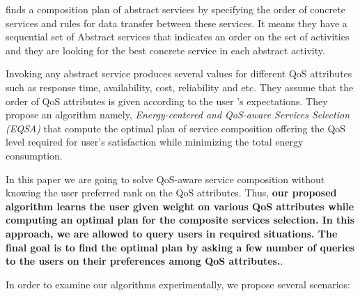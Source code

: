 \documentclass{sigchi}
\begin{document}
\cite{DBLP:journals/tase/KhanoucheACKY16} finds a composition plan of abstract services by specifying the order of concrete services and rules for data transfer between these services. It means they have a sequential set of Abstract services that indicates an order on the set of activities and they are looking for the best concrete service in each abstract activity. 

Invoking any abstract service produces several values for different QoS attributes such as response time, availability, cost, reliability and etc. They assume that the order of QoS attributes is given according to the user 's expectations. They propose an algorithm namely, \emph{Energy-centered and QoS-aware Services Selection (EQSA)} that compute the optimal plan of service composition offering the QoS level required for user's satisfaction while minimizing the total energy consumption.

In this paper we are going to solve QoS-aware service composition without knowing the user preferred rank on the QoS attributes. Thus, \textbf{our proposed algorithm learns the user given weight on various QoS attributes while computing an optimal plan for the composite services selection. In this approach, we are allowed to query users in required situations. The final goal is to find the optimal plan by asking a few number of queries to the users on their preferences among QoS attributes.}.

{\color{blue} In order to examine our algorithms experimentally, we propose several scenarios:}
\end{document}
